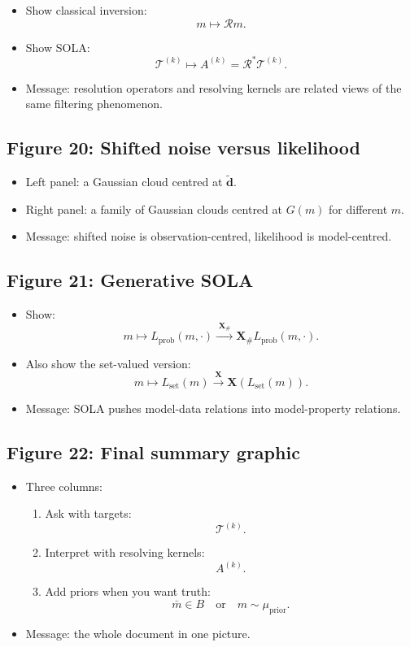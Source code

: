 \documentclass[11pt,openany]{book}
\theoremstyle{definition}
\theoremstyle{remark}
\begin{document}
\begin{itemize}[leftmargin=*]
  \item Show classical inversion:
  \[
    m\mapsto \mathcal Rm.
  \]
  \item Show SOLA:
  \[
    \mathcal T^{(k)}\mapsto A^{(k)}=\mathcal R^*\mathcal T^{(k)}.
  \]
  \item Message: resolution operators and resolving kernels are related views of the same
  filtering phenomenon.
\end{itemize}

\subsection*{Figure 20: Shifted noise versus likelihood}

\begin{itemize}[leftmargin=*]
  \item Left panel: a Gaussian cloud centred at \(\widetilde{\mathbf d}\).
  \item Right panel: a family of Gaussian clouds centred at \(G(m)\) for different \(m\).
  \item Message: shifted noise is observation-centred, likelihood is model-centred.
\end{itemize}

\subsection*{Figure 21: Generative SOLA}

\begin{itemize}[leftmargin=*]
  \item Show:
  \[
    m
    \mapsto
    L_{\mathrm{prob}}(m,\cdot)
    \xrightarrow{\;\mathbf X_{\#}\;}
    \mathbf X_{\#}L_{\mathrm{prob}}(m,\cdot).
  \]
  \item Also show the set-valued version:
  \[
    m
    \mapsto
    L_{\mathrm{set}}(m)
    \xrightarrow{\;\mathbf X\;}
    \mathbf X(L_{\mathrm{set}}(m)).
  \]
  \item Message: SOLA pushes model-data relations into model-property relations.
\end{itemize}

\subsection*{Figure 22: Final summary graphic}

\begin{itemize}[leftmargin=*]
  \item Three columns:
  \begin{enumerate}[label=(\arabic*)]
    \item Ask with targets:
    \[
      \mathcal T^{(k)}.
    \]
    \item Interpret with resolving kernels:
    \[
      A^{(k)}.
    \]
    \item Add priors when you want truth:
    \[
      \bar m\in B
      \quad\text{or}\quad
      m\sim\mu_{\mathrm{prior}}.
    \]
  \end{enumerate}
  \item Message: the whole document in one picture.
\end{itemize}
\end{document}
